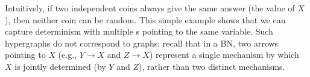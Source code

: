 Intuitively, if two independent coins always give the same answer (the value of $X$), then neither coin can be random. 
This simple example shows that we can capture determinism with multiple \arc s pointing to the same variable.
Such hypergraphs do not correspond to graphs; 
    recall that in a BN, two arrows pointing to $X$
    (e.g., $Y \to X$ and $Z \to X$)
    represent a single mechanism by which $X$ is jointly determined
        (by $Y$ and $Z$),
    rather than two distinct mechanisms.

